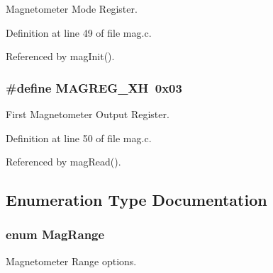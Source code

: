 Magnetometer Mode Register. 



Definition at line 49 of file mag.\-c.



Referenced by mag\-Init().

\hypertarget{group__mag_ga84e94fce89f9ba26ff3f33621c3a63bd}{
\subsubsection[{M\-A\-G\-R\-E\-G\-\_\-\-X\-H}]{\setlength{\rightskip}{0pt plus 5cm}\#define M\-A\-G\-R\-E\-G\-\_\-\-X\-H~0x03}}\label{group__mag_ga84e94fce89f9ba26ff3f33621c3a63bd}


First Magnetometer Output Register. 



Definition at line 50 of file mag.\-c.



Referenced by mag\-Read().



\subsection{Enumeration Type Documentation}
\hypertarget{group__mag_ga3af649d913d146d6654db2354d88c18a}{
\subsubsection[{Mag\-Range}]{\setlength{\rightskip}{0pt plus 5cm}enum {\bf Mag\-Range}}}\label{group__mag_ga3af649d913d146d6654db2354d88c18a}


Magnetometer Range options. 

